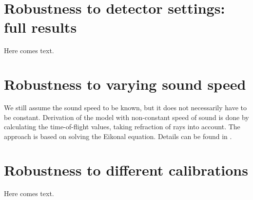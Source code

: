 \documentclass[journal]{IEEEtran}
\newcommand{\hl}[1]{\cbcolor{red}\begin{changebar}{#1}\end{changebar}}
\begin{document}
\ifCLASSOPTIONcaptionsoff
  \newpage
\fi

\small{

}

\appendices

\hl{
\section{Robustness to detector settings: full results}\label{app:det}
Here comes text. 

\section{Robustness to varying sound speed}\label{app:SoS}
We still assume the sound speed to be known, but it does not necessarily have to be constant. Derivation of the model with non-constant speed of sound is done by calculating the time-of-flight values, taking refraction of rays into account. The approach is based on solving the Eikonal equation. Details can be found in \cite[section 5.3]{Willemink2010}.

\section{Robustness to different calibrations}\label{app:cal}
Here comes text. 
}
\end{document}
